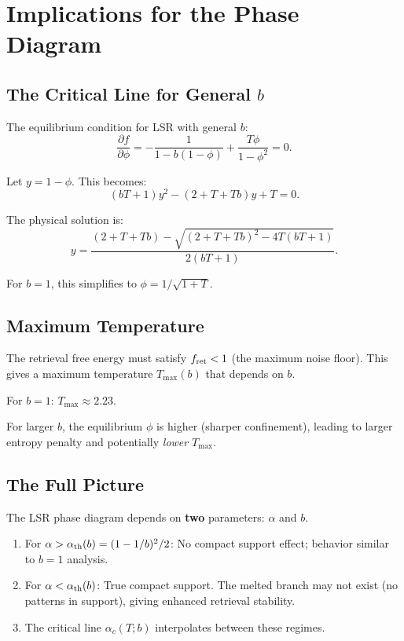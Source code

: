 \documentclass[11pt]{article}
\begin{document}
\section{Implications for the Phase Diagram}

\subsection{The Critical Line for General $b$}

The equilibrium condition for LSR with general $b$:
\begin{equation}
    \frac{\partial f}{\partial \phi} = -\frac{1}{1 - b(1-\phi)} + \frac{T\phi}{1-\phi^2} = 0.
\end{equation}

Let $y = 1 - \phi$. This becomes:
\begin{equation}
    (bT + 1)y^2 - (2 + T + Tb)y + T = 0.
\end{equation}

The physical solution is:
\begin{equation}
    y = \frac{(2 + T + Tb) - \sqrt{(2 + T + Tb)^2 - 4T(bT + 1)}}{2(bT + 1)}.
\end{equation}

For $b = 1$, this simplifies to $\phi = 1/\sqrt{1+T}$.

\subsection{Maximum Temperature}

The retrieval free energy must satisfy $f_{\rm ret} < 1$ (the maximum noise floor). This gives a maximum temperature $T_{\max}(b)$ that depends on $b$.

For $b = 1$: $T_{\max} \approx 2.23$.

For larger $b$, the equilibrium $\phi$ is higher (sharper confinement), leading to larger entropy penalty and potentially \emph{lower} $T_{\max}$.

\subsection{The Full Picture}

The LSR phase diagram depends on \textbf{two} parameters: $\alpha$ and $b$.

\begin{enumerate}
    \item For $\alpha > \alpha_{\rm th}(b) = (1 - 1/b)^2/2$: No compact support effect; behavior similar to $b = 1$ analysis.

    \item For $\alpha < \alpha_{\rm th}(b)$: True compact support. The melted branch may not exist (no patterns in support), giving enhanced retrieval stability.

    \item The critical line $\alpha_c(T; b)$ interpolates between these regimes.
\end{enumerate}
\end{document}
